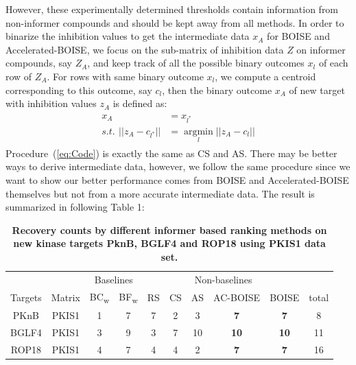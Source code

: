 \documentclass[12pt]{article}
\DeclareMathOperator*{\argmin}{argmin}
\begin{document}
However, these experimentally determined thresholds contain information from non-informer compounds and should be kept away from all methods. In order to binarize the inhibition values to get the intermediate data $x_A$ for BOISE and Accelerated-BOISE, we focus on the sub-matrix of inhibition data $Z$ on informer compounds, say $Z_A$, and keep track of all the possible binary outcomes $x_l$ of each row of $Z_A$. For rows with same binary outcome $x_l$, we compute a centroid corresponding to this outcome, say $c_l$, then the binary outcome $x_A$ of new target with inhibition values $z_A$ is defined as:
\begin{align}
    \label{eq:Code}
    \begin{split}
        x_A &= x_{l^*} \\
        s.t.\,~ ||z_A - c_{l^*}|| &= \argmin\limits_{l} ||z_A-c_l||
    \end{split}
\end{align}
Procedure~(\ref{eq:Code}) is exactly the same as CS and AS. There may be better ways to derive intermediate data, however, we follow the same procedure since we want to show our better performance comes from BOISE and Accelerated-BOISE themselves but not from a more accurate intermediate data. The result is summarized in following Table 1:
\bigskip
\begin{table}[ht!]
\centering
\caption{\label{tbl:t1}
{\bf Recovery counts by different informer based ranking methods on new kinase targets PknB, BGLF4 and ROP18 using PKIS1 data set.}}

\begin{tabular}{ cccccccccc }
\multicolumn{2}{l}{} & \multicolumn{2}{c}{Baselines} & \multicolumn{5}{c}{Non-baselines} \\
\multicolumn{1}{c}{Targets} & \multicolumn{1}{c}{Matrix} & \multicolumn{1}{c}{BC\textsubscript{w}} & \multicolumn{1}{c}{BF\textsubscript{w}} & \multicolumn{1}{c}{RS} & 
\multicolumn{1}{c}{CS} & 
\multicolumn{1}{c}{AS} & 
\multicolumn{1}{c}{AC-BOISE} &
\multicolumn{1}{c}{BOISE} & \multicolumn{1}{c}{total} \\
 \hline
 PKnB & PKIS1 & 1 & 7 & 7 & 2& 3 & \textbf{7} &\textbf{7} & 8 \\
 BGLF4 & PKIS1 & 3 & 9 & 3 & 7 & 10 & \textbf{10} &\textbf{10} & 11 \\
 ROP18 & PKIS1 & 4 & 7 & 4 & 4 & 2 & \textbf{7} & \textbf{7} &16 \\
\end{tabular}\\
\end{table}
\bigskip
\end{document}
